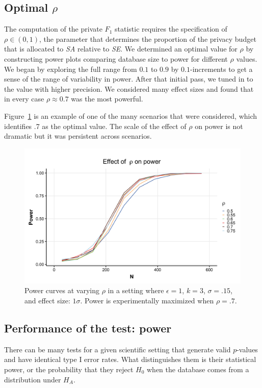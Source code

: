 \documentclass[USenglish,oneside]{article}
\newcounter{ag}
\newcounter{ab}
\newcounter{ar}
\newcounter{igh}
\newcommand{\epsfrac}{\ensuremath{\rho}\xspace}
\newcommand{\se}{\textit{SE}\xspace}
\newcommand{\sa}{\textit{SA}\xspace}
\begin{document}
\subsection{Optimal \epsfrac}\label{subsec:optrho}

The computation of the private $F_1$ statistic requires the specification of $\epsfrac \in (0, 1)$, the parameter that determines the proportion of the privacy budget that is allocated to \sa relative to \se. We determined an optimal value for $\epsfrac$ by constructing power plots comparing database size to power for different \epsfrac values. We began by exploring the full range from $0.1$ to $0.9$ by $0.1$-increments to get a sense of the range of variability in power. After that initial pass, we tuned in to the value with higher precision. We considered many effect sizes and found that in every case $\epsfrac \approx 0.7$ was the most powerful.

Figure~\ref{Fig:f1-epsfrac} is an example of one of the many scenarios that were considered, which identifies .7 as the optimal value. The scale of the effect of $\rho$ on power is not dramatic but it was persistent across scenarios.

\begin{figure}
\centering
\includegraphics[width=.6\linewidth]{images/f1-epsfrac.png}
\caption{Power curves at varying $\rho$ in a setting where $\epsilon = 1$, $k = 3$, $\sigma = .15$, and effect size: $1\sigma$. Power is experimentally maximized when $\rho = .7$.\label{Fig:f1-epsfrac}}
\end{figure}

\subsection{Performance of the test: power}
\label{subsec:power-analysis}

There can be many tests for a given scientific setting that generate valid $p$-values and have identical type I error rates. What distinguishes them is their statistical power, or the probability that they reject $H_0$ when the database comes from a distribution under $H_A$.
\end{document}

